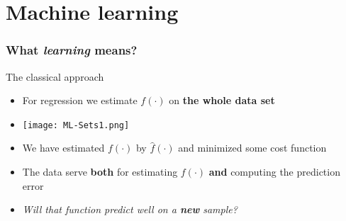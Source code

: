 \documentclass[xcolor=x11names,compress, aspectratio=169]{beamer}
\renewcommand{\(}{\begin{columns}}
\renewcommand{\)}{\end{columns}}
\newcommand{\<}[1]{\begin{column}{#1}}
\renewcommand{\>}{\end{column}}
\begin{document}
\section{Machine learning}

%
%


\begin{frame}
\frametitle{\textcolor{brique}{ What \emph{learning} means?}}
The classical approach
\begin{itemize}[<+->]
\item For regression we estimate $f(\cdot)$ on \textbf{the whole data set}
\item[] \texttt{[image: ML-Sets1.png]}
\item We have estimated $f(\cdot)$ by $\widehat f(\cdot)$  and minimized some cost function
\item The data serve \textbf{both} for estimating $f(\cdot)$ \textbf{and} computing the prediction error
\item \emph{Will that function predict well on a \textcolor[rgb]{1.00,0.00,0.00}{\textbf{new }}sample?}
\end{itemize}
\end{frame}
\end{document}
